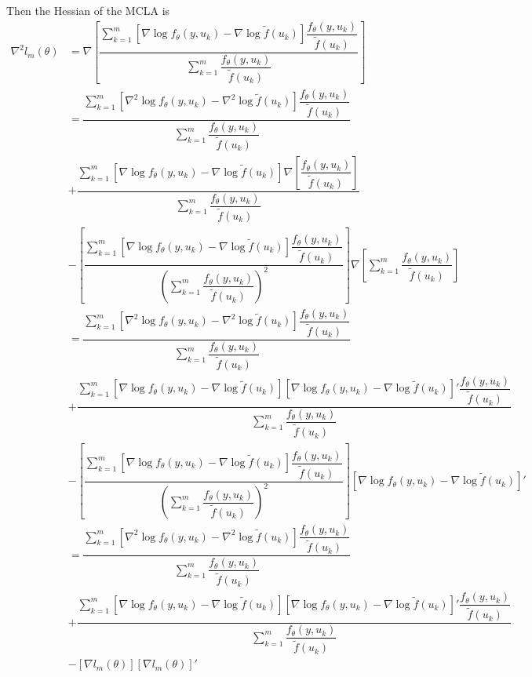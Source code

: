 \documentclass{article}
\begin{document}
Then the Hessian of the MCLA is
\begin{align}
\nabla^2 l_m (\theta) &= \nabla \left[ \dfrac{   \sum_{k=1}^m \left[ \nabla \log f_\theta(y,u_k)  -
   \nabla \log \tilde{f}(u_k)   \right]  \dfrac{ f_\theta(y,u_k)}{\tilde{f}(u_k)}  }{\sum_{k=1}^m  \dfrac{ f_\theta(y,u_k)   }{\tilde{f}(u_k)}} \right] \\
&= \dfrac{   \sum_{k=1}^m \left[ \nabla^2 \log f_\theta(y,u_k)  -
   \nabla^2 \log \tilde{f}(u_k)   \right]  \dfrac{ f_\theta(y,u_k)}{\tilde{f}(u_k)}  }{\sum_{k=1}^m  \dfrac{ f_\theta(y,u_k)   }{\tilde{f}(u_k)}}\\
&+ \dfrac{   \sum_{k=1}^m \left[ \nabla \log f_\theta(y,u_k)  -
   \nabla \log \tilde{f}(u_k)   \right]  \nabla \left[ \dfrac{ f_\theta(y,u_k)}{\tilde{f}(u_k)} \right]  }{\sum_{k=1}^m  \dfrac{ f_\theta(y,u_k)   }{\tilde{f}(u_k)}}\\
&-\left[\dfrac{   \sum_{k=1}^m \left[ \nabla \log f_\theta(y,u_k)  -
   \nabla \log \tilde{f}(u_k)   \right]  \dfrac{ f_\theta(y,u_k)}{\tilde{f}(u_k)}  }{ \left( \sum_{k=1}^m  \dfrac{ f_\theta(y,u_k)   }{\tilde{f}(u_k)} \right)^2} \right] \nabla \left[ \sum_{k=1}^m  \dfrac{ f_\theta(y,u_k)   }{\tilde{f}(u_k)} \right]\\
&= \dfrac{   \sum_{k=1}^m \left[ \nabla^2 \log f_\theta(y,u_k)  -
   \nabla^2 \log \tilde{f}(u_k)   \right]  \dfrac{ f_\theta(y,u_k)}{\tilde{f}(u_k)}  }{\sum_{k=1}^m  \dfrac{ f_\theta(y,u_k)   }{\tilde{f}(u_k)}}\\
&+ \dfrac{   \sum_{k=1}^m \left[ \nabla \log f_\theta(y,u_k)  -
   \nabla \log \tilde{f}(u_k)   \right] \left[ \nabla \log f_\theta(y,u_k)  -
   \nabla \log \tilde{f}(u_k)   \right]'  \dfrac{ f_\theta(y,u_k)   }{\tilde{f}(u_k)}   }{\sum_{k=1}^m  \dfrac{ f_\theta(y,u_k)   }{\tilde{f}(u_k)}}\\
&-\left[\dfrac{   \sum_{k=1}^m \left[ \nabla \log f_\theta(y,u_k)  -  \nabla \log \tilde{f}(u_k)   \right]  \dfrac{ f_\theta(y,u_k)}{\tilde{f}(u_k)}  }{ \left( \sum_{k=1}^m  \dfrac{ f_\theta(y,u_k)   }{\tilde{f}(u_k)} \right)^2} \right] \left[  \nabla \log f_\theta(y,u_k)  -  \nabla \log \tilde{f}(u_k)     \right]'\\
&= \dfrac{   \sum_{k=1}^m \left[ \nabla^2 \log f_\theta(y,u_k)  -
   \nabla^2 \log \tilde{f}(u_k)   \right]  \dfrac{ f_\theta(y,u_k)}{\tilde{f}(u_k)}  }{\sum_{k=1}^m  \dfrac{ f_\theta(y,u_k)   }{\tilde{f}(u_k)}}\\
&+ \dfrac{   \sum_{k=1}^m \left[ \nabla \log f_\theta(y,u_k)  -
   \nabla \log \tilde{f}(u_k)   \right] \left[ \nabla \log f_\theta(y,u_k)  -
   \nabla \log \tilde{f}(u_k)   \right]'  \dfrac{ f_\theta(y,u_k)   }{\tilde{f}(u_k)}   }{\sum_{k=1}^m  \dfrac{ f_\theta(y,u_k)   }{\tilde{f}(u_k)}}\\
&- \left[ \nabla l_m(\theta)  \right] \left[ \nabla l_m(\theta)  \right]'
\end{align}
\end{document}
